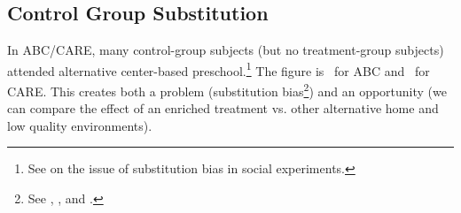 \subsection{Control Group Substitution}

In ABC/CARE, many control-group subjects (but no treatment-group subjects) attended alternative center-based preschool.\footnote{See \cite{Heckman_Hohmann_etal_2000_QJE} on the issue of substitution bias in social experiments.} The figure is \treatsubsabc\ for ABC and \treatsubscarec\ for CARE. This creates both a problem (substitution bias\footnote{See \cite{Heckman_1992_randomization}, \cite{Heckman_Hohmann_etal_2000_QJE}, and \cite{Kline_Walters_2016_QJE}.}) and an opportunity (we can compare the effect of an enriched treatment vs. other alternative home and low quality environments).

